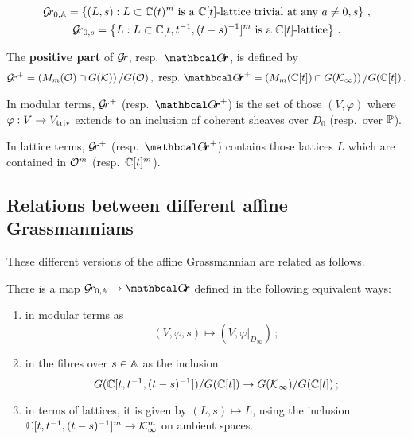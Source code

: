 \documentclass{article} %
\begin{document}
% 
\begin{gather*}
\Grbd = 
    \left\{ 
        (L,s) : L \subset  \CC(t)^m\text{ is a $\CC[t]$-lattice trivial at any }a \ne 0, s 
    \right\}\,, \\
\Gr_{0,s} = 
    \left\{ 
        L : L \subset  \CC[t,t^{-1},(t-s)^{-1}]^m \text{ is a $\CC[t]$-lattice} 
    \right\}\,.
\end{gather*}
% 
\begin{definition} 
\label{def:grplus}
The \textbf{positive part} of $\Gr $, resp.\ $\Grth$, is defined by 
\begin{gather*}
    \Gr^+ = \left(M_m(\cO) \cap G(\cK)\right) / G(\cO)\,,\,\, %
    \text{resp.\ } {\Grth}^+ = \left(M_m(\CC[t]) \cap G(\Kinf)\right) / G(\CC[t])\,. 
\end{gather*}
\end{definition}
% 
In modular terms, $\Gr^+$ (resp.\ ${\Grth}^+$) is the set of those $ (V, \varphi)$ where $ \varphi : V \rightarrow \Vtriv $ extends to an inclusion of coherent sheaves over $ D_0 $ (resp.\ over $ \PP$).

In lattice terms, $ \Gr^+$ (resp.\ ${\Grth}^+$) contains those lattices $L$ which are contained in $\cO^m$ (resp.\ $\CC[t]^m$).
% 
\subsection{Relations between different affine Grassmannians}
\label{ss:relsbtwgrs}
% 
These different versions of the affine Grassmannian are related as follows.  
% 
\begin{proposition}
    \label{pr:bd-th}
    There is a map $\Grbd \rightarrow \Grth $ defined in the following equivalent ways:
    \begin{enumerate}
        \item in modular terms as $$(V,\varphi,s)\mapsto (V, \varphi \big|_{D_\infty}) \, ;$$
        \item in the fibres over $ s \in \AA$ as the inclusion $$
        G(\CC[t, t^{-1}, (t-s)^{-1}])/ G(\CC[t]) \rightarrow G(\Kinf)/G(\CC[t])\,;$$
        \item in terms of lattices, it is given by $(L,s)\mapsto L$, using the inclusion $\CC[t, t^{-1}, (t-s)^{-1}]^m \rightarrow \Kinf^m$ on ambient spaces. 
    \end{enumerate}
\end{proposition}
% 
\end{document}
